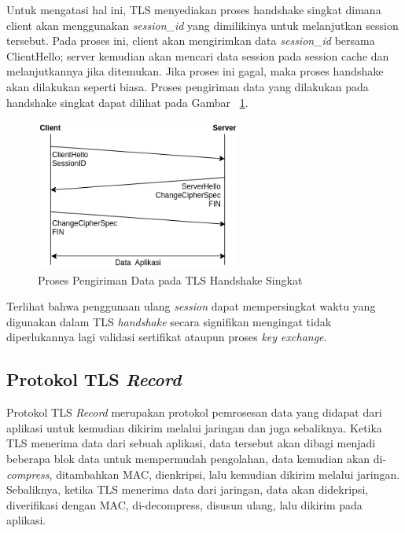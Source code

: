     Untuk mengatasi hal ini, TLS menyediakan proses handshake singkat dimana client akan menggunakan \textit{session\_id} yang dimilikinya untuk melanjutkan session tersebut. Pada proses ini, client akan mengirimkan data \textit{session\_id} bersama ClientHello; server kemudian akan mencari data session pada session cache dan melanjutkannya jika ditemukan. Jika proses ini gagal, maka proses handshake akan dilakukan seperti biasa. Proses pengiriman data yang dilakukan pada handshake singkat dapat dilihat pada Gambar ~\ref{fig:tls-fast-handshake}.

    \begin{figure}[h]
      \centering
      \includegraphics[width=0.6\textwidth]{resources/img/ch-2/fast-handshake.png}
      \caption{Proses Pengiriman Data pada TLS Handshake Singkat \protect\citep{rfc5246}}
      \label{fig:tls-fast-handshake}
    \end{figure}

    Terlihat bahwa penggunaan ulang \textit{session} dapat mempersingkat waktu yang digunakan dalam TLS \textit{handshake} secara signifikan mengingat tidak diperlukannya lagi validasi sertifikat ataupun proses \textit{key exchange}.

  \subsection{Protokol TLS \textit{Record}}
    Protokol TLS \textit{Record} merupakan protokol pemrosesan data yang didapat dari aplikasi untuk kemudian dikirim melalui jaringan dan juga sebaliknya. Ketika TLS menerima data dari sebuah aplikasi, data tersebut akan dibagi menjadi beberapa blok data untuk mempermudah pengolahan, data kemudian akan di-\textit{compress}, ditambahkan MAC, dienkripsi, lalu kemudian dikirim melalui jaringan. Sebaliknya, ketika TLS menerima data dari jaringan, data akan didekripsi, diverifikasi dengan MAC, di-decompress, disusun ulang, lalu dikirim pada aplikasi.

